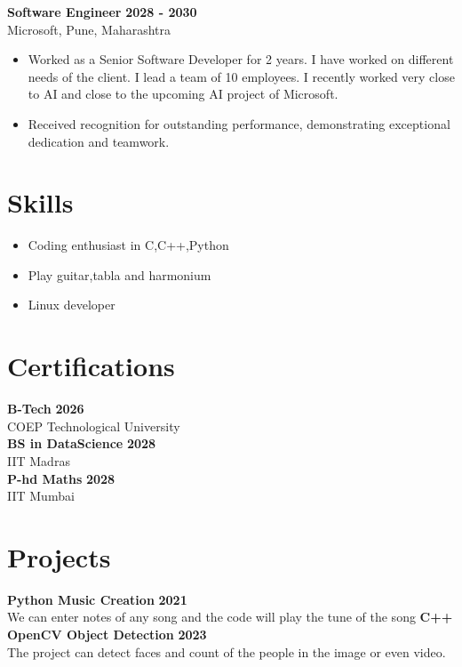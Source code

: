 \documentclass[a4paper,10pt]{article}
\begin{document}
\textbf{Software Engineer} \hfill \textbf{2028 - 2030}\\
Microsoft, Pune, Maharashtra\\
\begin{itemize}
    \item Worked as a Senior Software Developer for 2 years. I have worked on different needs of the client. I lead a team of 10 employees. I recently worked very close to AI and close to the upcoming AI project of Microsoft.
    \item Received recognition for outstanding performance, demonstrating exceptional dedication and teamwork.
\end{itemize}


\section*{Skills}
\begin{itemize}
    \item Coding enthusiast in C,C++,Python
    \item Play guitar,tabla and harmonium
\item Linux developer
\end{itemize}

\section*{Certifications}
\textbf{B-Tech} \hfill \textbf{2026}\\
COEP Technological University\\
\textbf{BS in DataScience} \hfill \textbf{2028}\\
IIT Madras\\
\textbf{P-hd Maths} \hfill \textbf{2028}\\
IIT Mumbai\\



\section*{Projects}
\textbf{Python Music Creation} \hfill \textbf{2021}\\
We can enter notes of any song and the code will play the tune of the song
\newline
\textbf{C++ OpenCV Object Detection} \hfill \textbf{2023}\\
The project can detect faces and count of the people in the image or even video.
\end{document}
